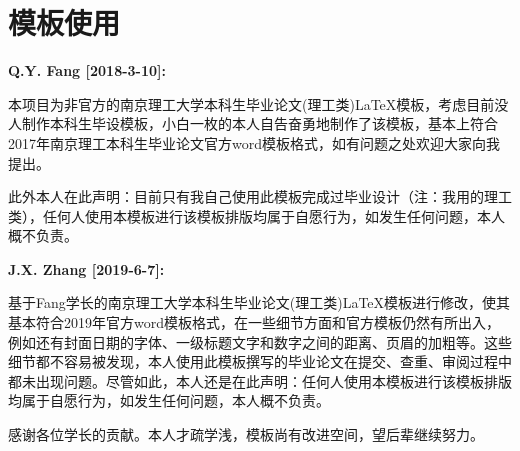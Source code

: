 {

\chapter{模板使用}
\songti\xiaosi
\begin{spacing}{1.5}

\noindent \textbf{Q.Y. Fang [2018-3-10]:}

本项目为非官方的南京理工大学本科生毕业论文(理工类)\LaTeX 模板，考虑目前没人制作本科生毕设模板，小白一枚的本人自告奋勇地制作了该模板，基本上符合2017年南京理工本科生毕业论文官方word模板格式，如有问题之处欢迎大家向我提出。

此外本人在此声明：目前只有我自己使用此模板完成过毕业设计（注：我用的理工类），任何人使用本模板进行该模板排版均属于自愿行为，如发生任何问题，本人概不负责。
\vspace{1ex}

\noindent \textbf{J.X. Zhang [2019-6-7]:}

基于Fang学长的南京理工大学本科生毕业论文(理工类)\LaTeX 模板进行修改，使其基本符合2019年官方word模板格式，在一些细节方面和官方模板仍然有所出入，例如还有封面日期的字体、一级标题文字和数字之间的距离、页眉的加粗等。这些细节都不容易被发现，本人使用此模板撰写的毕业论文在提交、查重、审阅过程中都未出现问题。尽管如此，本人还是在此声明：任何人使用本模板进行该模板排版均属于自愿行为，如发生任何问题，本人概不负责。

感谢各位学长的贡献。本人才疏学浅，模板尚有改进空间，望后辈继续努力。


\end{spacing}}
